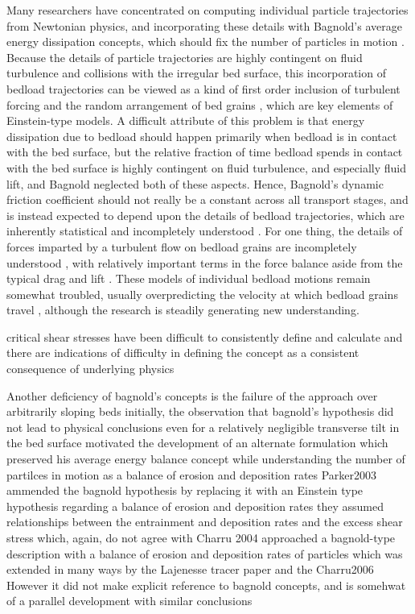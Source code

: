 \documentclass{article}
\begin{document}
Many researchers have concentrated on computing individual particle trajectories from Newtonian physics, and incorporating these details with Bagnold's average energy dissipation concepts, which should fix the number of particles in motion \citep{Abbott1977, Bridge1984, Wiberg1989, Bridge1992, Nino1998, Bialik2015}. 
Because the details of particle trajectories are highly contingent on fluid turbulence and collisions with the irregular bed surface, this incorporation of bedload trajectories can be viewed as a kind of first order inclusion of turbulent forcing and the random arrangement of bed grains \citep{}, which are key elements of Einstein-type models. 
A difficult attribute of this problem is that energy dissipation due to bedload should happen primarily when bedload is in contact with the bed surface, but the relative fraction of time bedload spends in contact with the bed surface is highly contingent on fluid turbulence, and especially fluid lift, and Bagnold neglected both of these aspects. 
Hence, Bagnold's dynamic friction coefficient should not really be a constant across all transport stages, and is instead expected to depend upon the details of bedload trajectories, which are inherently statistical and incompletely understood \citep{Bialik2015}. 
For one thing, the details of forces imparted by a turbulent flow on bedload grains are incompletely understood \citep{Maxey1986, Schmeeckle2007, Dwivedi2010, Dwivedi2011}, with relatively important terms in the force balance aside from the typical drag and lift \citep{Bialik2015}.
These models of individual bedload motions remain somewhat troubled, usually overpredicting the velocity at which bedload grains travel \citep{Bialik2015}, although the research is steadily generating new understanding. 


critical shear stresses have been difficult to consistently define and calculate
and there are indications of difficulty in defining the concept as a consistent consequence of underlying physics 


Another deficiency of bagnold's concepts is the failure of the approach over arbitrarily sloping beds
initially, the observation that bagnold's hypothesis did not lead to physical conclusions even for a relatively negligible transverse tilt in the bed surface
motivated the development of an alternate formulation which preserved his average energy balance concept while understanding the number of partilces in motion as a balance of erosion and deposition rates
Parker2003 ammended the bagnold hypothesis by replacing it with an Einstein type hypothesis regarding a balance of erosion and deposition rates 
they assumed relationships between the entrainment and deposition rates and the excess shear stress which, again, do not agree with 
Charru 2004 approached a bagnold-type description with a balance of erosion and deposition rates of particles
which was extended in many ways by the Lajenesse tracer paper and the Charru2006
However it did not make explicit reference to bagnold concepts, and is somehwat of a parallel development with similar conclusions
\end{document}
